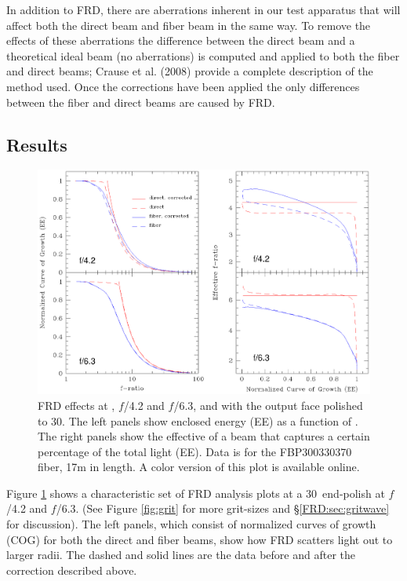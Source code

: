 In addition to FRD, there are aberrations inherent in our test
apparatus that will affect both the direct beam and fiber beam in the
same way. To remove the effects of these aberrations the difference
between the direct beam and a theoretical ideal beam (no aberrations)
is computed and applied to both the fiber and direct beams; Crause et
al. (2008)\cite{Crause_08} provide a complete description of the
method used. Once the corrections have been applied the only
differences between the fiber and direct beams are caused by FRD.

\subsection{Results}
\label{FRD:sec:results}

\begin{figure}[ht]
\begin{center}
\includegraphics[width=\textwidth, trim=0 2.6in 0 0, clip=true]{FRD/figs/basic_FRD.eps}
\caption{\fixspacing\label{fig:basicFRD} FRD effects at \filty, $f$/4.2 and
  $f$/6.3, and with the output face polished to 30\mum. The left
  panels show enclosed energy (EE) as a function of \fratio. The right
  panels show the effective \fratio of a beam that captures a certain
  percentage of the total light (EE). Data is for the FBP300330370
  fiber, 17m in length. A color version of this plot is available online.}
\end{center}
\end{figure}

Figure \ref{fig:basicFRD} shows a characteristic set of FRD analysis
plots at a 30\mum\ end-polish at $f$/4.2 and $f$/6.3.  (See Figure
\ref{fig:grit} for more grit-sizes and \S\ref{FRD:sec:gritwave} for
discussion).  The left panels, which consist of normalized curves of
growth (COG) for both the direct and fiber beams, show how FRD
scatters light out to larger radii. The dashed and solid lines are the
data before and after the correction described above\cite{Crause_08}.

